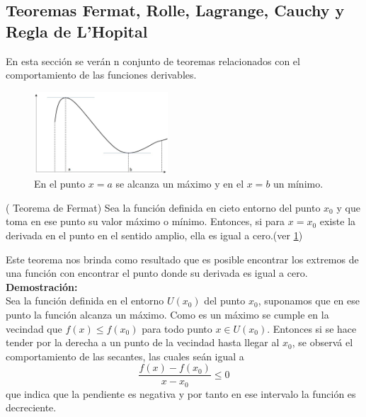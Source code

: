\documentclass[10pt,twoside]{SelfArx} %
\begin{document}
  \subsection{Teoremas Fermat, Rolle, Lagrange, Cauchy y Regla de L'Hopital}
 En esta sección se verán n conjunto de teoremas relacionados con el comportamiento de las funciones derivables.
 \begin{figure}
 	\centering
 	\includegraphics[width=5cm]{fermat1}
 	\caption{En el punto $ x=a $ se alcanza un m\'aximo y en el $ x=b $ un m\'inimo.}
 	\label{fermat1}
 \end{figure}
 \begin{teorema}
 	( Teorema de Fermat)
 	Sea la función definida en cieto entorno del punto $ x_{0} $ y que toma en ese punto su valor máximo o mínimo. Entonces, si para $ x=x_{0} $ existe la derivada en el punto en el sentido amplio, ella es igual a cero.(ver \ref{fermat1})
 \end{teorema}
 Este teorema nos brinda como resultado que es posible encontrar los extremos de una función con encontrar el punto donde su derivada es igual a cero.\\
 \textbf{Demostración:}\\
 Sea la funci\'on definida en el entorno $ U(x_{0}) $ del punto $ x_{0} $, suponamos que en ese punto la funci\'on alcanza un m\'aximo. 
 Como es un máximo se cumple en la vecindad que $ f(x)\leq f(x_{0}) $ para todo punto $ x\in U(x_{0}) $.
 Entonces si se hace tender por la derecha a un punto de la vecindad hasta llegar al $ x_{0} $, se observ\'a el comportamiento de las secantes, las cuales se\'an igual a 
 \begin{equation}
\dfrac{ f(x)-f(x_{0})}{x-x_{0}}\leq0
 \end{equation}
 que indica que la pendiente es negativa y por tanto en ese intervalo la funci\'on es decreciente.\\
\end{document}

